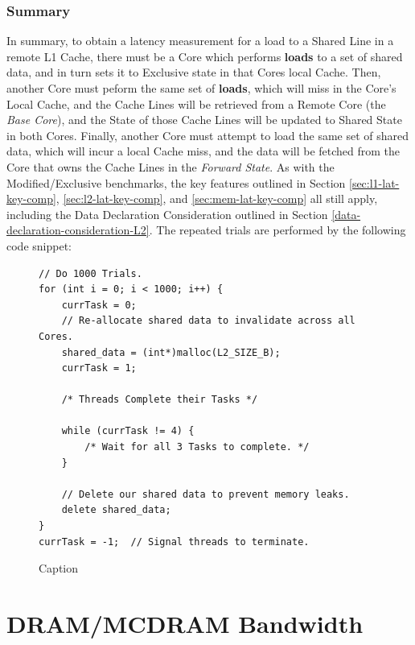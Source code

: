 \documentclass[bsc,frontabs,twoside,singlespacing,parskip,deptreport]{infthesis}     %
\begin{document}
\subsubsection{Summary}
In summary, to obtain a latency measurement for a load to a Shared Line in a remote L1 Cache, there must be a Core which performs \textbf{loads} to a set of shared data, and in turn sets it to Exclusive state in that Cores local Cache. Then, another Core must peform the same set of \textbf{loads}, which will miss in the Core's Local Cache, and the Cache Lines will be retrieved from a Remote Core (the \emph{Base Core}), and the State of those Cache Lines will be updated to Shared State in both Cores. Finally, another Core must attempt to load the same set of shared data, which will incur a local Cache miss, and the data will be fetched from the Core that owns the Cache Lines in the \textit{Forward State}. As with the Modified/Exclusive benchmarks, the key features outlined in Section \ref{sec:l1-lat-key-comp}, \ref{sec:l2-lat-key-comp}, and \ref{sec:mem-lat-key-comp} all still apply, including the Data Declaration Consideration outlined in Section \ref{data-declaration-consideration-L2}. The repeated trials are performed by the following code snippet:
\begin{figure}[!h]
    \centering
    \begin{minipage}{0.8\textwidth}
    \begin{verbatim}
// Do 1000 Trials.
for (int i = 0; i < 1000; i++) {
    currTask = 0;
    // Re-allocate shared data to invalidate across all Cores.
    shared_data = (int*)malloc(L2_SIZE_B);
    currTask = 1;

    /* Threads Complete their Tasks */
        
    while (currTask != 4) {
        /* Wait for all 3 Tasks to complete. */
    }

    // Delete our shared data to prevent memory leaks.
    delete shared_data;
}
currTask = -1;  // Signal threads to terminate.
    \end{verbatim}
    \end{minipage}
    \caption{Caption}
    \label{fig:remote-S-repeat}
\end{figure}

\newpage


\section{DRAM/MCDRAM Bandwidth}\label{mcdram-dram-benchmarks-bw}
\end{document}
